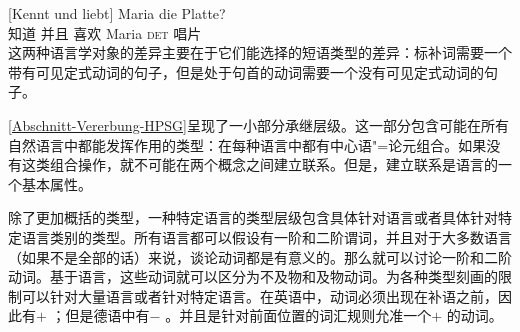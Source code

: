 \ex 
\gll {}[Kennt und liebt] Maria die Platte?\\
	 {}\spacebr{}知道 并且 喜欢 Maria \textsc{det} 唱片\\
\zl
这两种语言学对象的差异主要在于它们能选择的短语类型的差异：标补词需要一个带有可见定式动词的句子，但是处于句首的动词需要一个没有可见定式动词的句子。

\ref{Abschnitt-Vererbung-HPSG}呈现了一小部分承继层级。这一部分包含可能在所有自然语言中都能发挥作用的类型：在每种语言中都有中心语"=论元组合。如果没有这类组合操作，就不可能在两个概念之间建立联系。但是，建立联系是语言的一个基本属性。

除了更加概括的类型，一种特定语言的类型层级包含具体针对语言或者具体针对特定语言类别的类型。所有语言都可以假设有一阶和二阶谓词，并且对于大多数语言（如果不是全部的话）来说，谈论动词都是有意义的。那么就可以讨论一阶和二阶动词。基于语言，这些动词就可以区分为不及物和及物动词。为各种类型刻画的限制可以针对大量语言或者针对特定语言。在英语中，动词必须出现在补语之前，因此有\initialv $+$ ；但是德语中有\initialv $-$ 。并且是针对前面位置的词汇规则允准一个\initialv $+$ 的动词。

